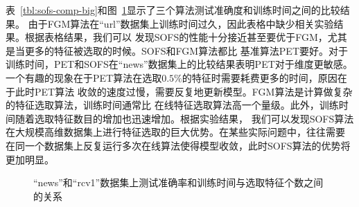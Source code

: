 表~\ref{tbl:sofs-comp-big}和图~\ref{fig:sofs-comp-big}显示了三个算法测试准确度和训练时间之间的比较结果。
由于FGM算法在``url''数据集上训练时间过久，因此表格中缺少相关实验结果。根据表格结果，我们可以
发现SOFS的性能十分接近甚至要优于FGM，尤其是当更多的特征被选取的时候。SOFS和FGM算法都比
基准算法PET要好。对于训练时间，PET和SOFS在``news''数据集上的比较结果表明PET对于维度更敏感。
一个有趣的现象在于PET算法在选取$0.5\%$的特征时需要耗费更多的时间，原因在于此时PET算法
收敛的速度过慢，需要反复地更新模型。FGM算法是计算做复杂的特征选取算法，训练时间通常比
在线特征选取算法高一个量级。此外，训练时间随着选取特征数目的增加也迅速增加。根据实验结果，
我们可以发现SOFS算法在大规模高维数据集上进行特征选取的巨大优势。在某些实际问题中，往往需要
在同一个数据集上反复运行多次在线算法使得模型收敛，此时SOFS算法的优势将更加明显。
\begin{figure}
    \centerline{
    }
    \centerline{
    }
    \caption{``news''和``rcv1''数据集上测试准确率和训练时间与选取特征个数之间的关系}
    \label{fig:sofs-comp-big}
\end{figure}

